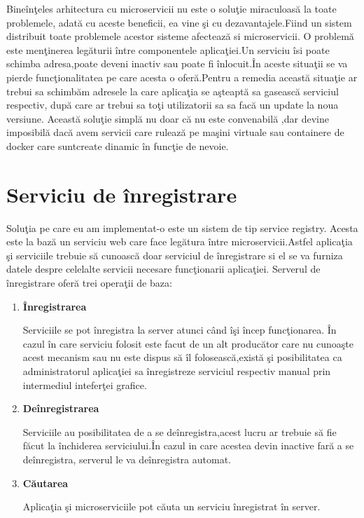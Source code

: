 \documentclass[a4paper,12pt]{report}
\begin{document}
Bine\^in\c teles arhitectura cu microservicii nu este o solu\c tie miraculoas\u a la toate problemele,
adat\u a cu aceste beneficii, ea vine \c si cu dezavantajele.Fiind un sistem distribuit toate
problemele acestor sisteme afecteaz\u a si microservicii.
O problem\u a este men\c tinerea leg\u aturii \^intre componentele aplica\c tiei.Un serviciu \^isi poate schimba 
adresa,poate deveni inactiv sau poate fi \^inlocuit.\^In aceste situa\c tii se va pierde func\c tionalitatea pe care acesta o 
ofer\u a.Pentru a remedia aceast\u a situa\c tie ar trebui sa schimb\u am adresele la care aplica\c tia se a\c steapt\u a sa 
gaseasc\u a serviciul respectiv, dup\u a care ar trebui sa to\c ti utilizatorii sa sa fac\u a un update la noua versiune.
Aceast\u a solu\c tie simpl\u a nu doar c\u a nu este convenabil\u a ,dar devine imposibil\u a dac\u a avem servicii care ruleaz\u a 
pe ma\c sini virtuale sau containere de docker care suntcreate dinamic \^in func\c tie de nevoie.
\section{Serviciu de \^inregistrare}
Solu\c tia pe care eu am implementat-o este un sistem de tip service registry.
Acesta este la baz\u a un serviciu web care face leg\u atura \^intre microservicii.Astfel aplica\c tia \c si serviciile trebuie 
s\u a cunoasc\u a doar serviciul de \^inregistrare si el se va furniza datele despre celelalte servicii necesare func\c tionarii aplica\c tiei. 
Serverul de \^ inregistrare ofer\u a trei opera\c tii de baza:
\begin{enumerate}
	\item \textbf{\^Inregistrarea}
	
			Serviciile se pot \^inregistra la server atunci c\^and \^i\c si \^incep func\c tionarea.
			\^In cazul \^in care serviciu folosit este facut de un alt produc\u ator care nu cunoa\c ste acest 
			mecanism sau nu este dispus s\u a \^il foloseasc\u a,exist\u a \c si posibilitatea ca administratorul 
			aplica\c tiei sa \^inregistreze serviciul respectiv manual prin intermediul intefer\c tei grafice.
	\item \textbf{De\^inregistrarea}

		  Serviciile au posibilitatea de a se de\^inregistra,acest lucru ar trebuie s\u a fie f\u acut la \^inchiderea 
		  serviciului.\^In cazul in care acestea devin inactive far\u a a se de\^inregistra, serverul le va de\^inregistra
		  automat.
	\item \textbf{C\u autarea}

		  Aplica\c tia \c si microserviciile pot c\u auta un serviciu \^inregistrat \^in server.
\end{enumerate}	
\end{document}
